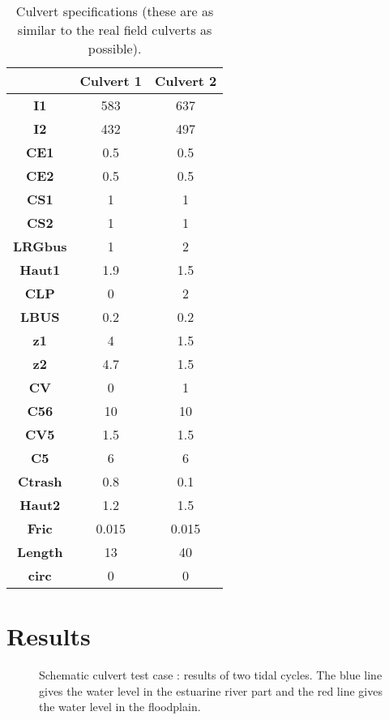 \begin{table}[H]
\caption{Culvert specifications (these are as similar to the real field culverts as possible).}\label{tab:culvert_table1}
\begin{center}\begin{tabular}{|c|c|c|}
\hline
~ & \textbf{Culvert 1} & \textbf{Culvert 2} \\
\hline
\textbf{I1} & 583 & 637 \\
\hline
\textbf{I2}	& 432	 & 497 \\
\hline
\textbf{CE1}	& 0.5	 & 0.5 \\
\hline
\textbf{CE2}	& 0.5	 & 0.5 \\
\hline
\textbf{CS1}	& 1	 & 1 \\
\hline
\textbf{CS2}	& 1	 & 1 \\
\hline
\textbf{LRGbus}	& 1	 & 2 \\
\hline
\textbf{Haut1}	& 1.9	 & 1.5 \\
\hline
\textbf{CLP}	& 0	 & 2 \\
\hline
\textbf{LBUS}	& 0.2	 & 0.2 \\
\hline
\textbf{z1}	& 4	 & 1.5 \\
\hline
\textbf{z2}	& 4.7	 & 1.5 \\
\hline
\textbf{CV}	& 0	 & 1 \\
\hline
\textbf{C56}	& 10	 & 10 \\
\hline
\textbf{CV5}	& 1.5	 & 1.5 \\
\hline
\textbf{C5}	& 6	 & 6 \\
\hline
\textbf{Ctrash}	& 0.8	 & 0.1 \\
\hline
\textbf{Haut2}	& 1.2	 & 1.5 \\
\hline
\textbf{Fric}	& 0.015 & 0.015 \\
\hline
\textbf{Length}	& 13	 & 40 \\
\hline
\textbf{circ}	& 0	 & 0 \\
\hline
\end{tabular}\end{center}
\end{table}

\section{Results}

\begin{figure}[h]
\begin{center}
\end{center}
\caption{Schematic culvert test case : results of two tidal cycles.
The blue line gives the water level in the estuarine river part and the red line gives the water level in the floodplain.}
\label{fig:culvert_figure2}
\end{figure}

